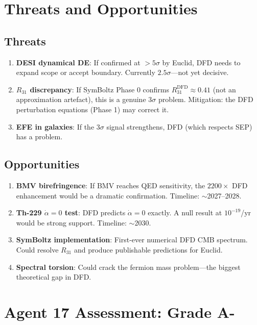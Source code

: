 \documentclass[11pt,a4paper]{article}
\begin{document}
\section{Threats and Opportunities}

\subsection{Threats}

\begin{enumerate}
\item \textbf{DESI dynamical DE}: If confirmed at $> 5\sigma$ by Euclid, DFD needs to expand scope or accept boundary. Currently $2.5\sigma$---not yet decisive.
\item \textbf{$R_{31}$ discrepancy}: If SymBoltz Phase 0 confirms $R_{31}^{\text{DFD}} \approx 0.41$ (not an approximation artefact), this is a genuine $3\sigma$ problem. Mitigation: the DFD perturbation equations (Phase 1) may correct it.
\item \textbf{EFE in galaxies}: If the $3\sigma$ signal strengthens, DFD (which respects SEP) has a problem.
\end{enumerate}

\subsection{Opportunities}

\begin{enumerate}
\item \textbf{BMV birefringence}: If BMV reaches QED sensitivity, the $2200\times$ DFD enhancement would be a dramatic confirmation. Timeline: $\sim$2027--2028.
\item \textbf{Th-229 $\dot\alpha = 0$ test}: DFD predicts $\dot\alpha = 0$ exactly. A null result at $10^{-19}$/yr would be strong support. Timeline: $\sim$2030.
\item \textbf{SymBoltz implementation}: First-ever numerical DFD CMB spectrum. Could resolve $R_{31}$ and produce publishable predictions for Euclid.
\item \textbf{Spectral torsion}: Could crack the fermion mass problem---the biggest theoretical gap in DFD.
\end{enumerate}

\section{Agent 17 Assessment: Grade A-}
\end{document}
